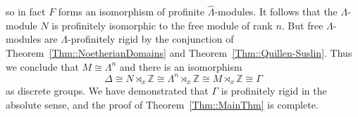 \documentclass{amsart}
\numberwithin{theorem}{section}
\numberwithin{equation}{section}
\newcommand{\Z}{\mathbb{Z}}
\begin{document}
so in fact $F$ forms an isomorphism of profinite $\widehat\Lambda$-modules. It follows that the $\Lambda$-module $N$ is profinitely isomorphic to the free module of rank $n$. But free $\Lambda$-modules are $\Lambda$-profinitely rigid by the conjunction of Theorem~\ref{Thm::NoetherianDomains} and Theorem~\ref{Thm::Quillen-Suslin}. Thus we conclude that $M \cong \Lambda^n$ and there is an isomorphism
\[
\Delta \cong N \rtimes_x \Z \cong \Lambda^n \rtimes_x \Z \cong M \rtimes_x \Z \cong \Gamma
\]
as discrete groups. We have demonstrated that $\Gamma$ is profinitely rigid in the absolute sense, and the proof of Theorem~\ref{Thm::MainThm} is complete.



\end{document}
